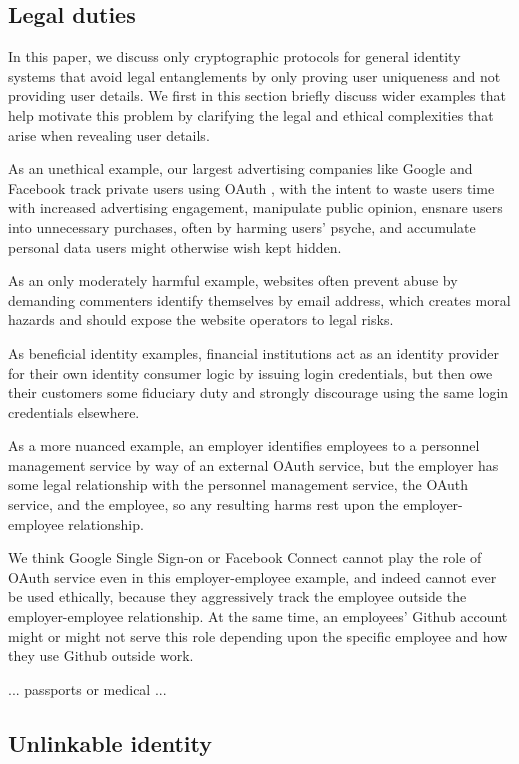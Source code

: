 \subsection{Legal duties}

In this paper, we discuss only cryptographic protocols for general identity systems that avoid legal entanglements by only proving user uniqueness and not providing user details.  We first in this section briefly discuss wider examples that help motivate this problem by clarifying the legal and ethical complexities that arise when revealing user details.

As an unethical example, our largest advertising companies like Google and Facebook track private users using OAuth \cite{oauth}, with the intent to waste users time with increased advertising engagement, manipulate public opinion, ensnare users into unnecessary purchases, often by harming users' psyche, and accumulate personal data users might otherwise wish kept hidden.

As an only moderately harmful example, websites often prevent abuse by demanding commenters identify themselves by email address, which creates moral hazards and should expose the website operators to legal risks.

As beneficial identity examples, financial institutions act as an identity provider for their own identity consumer logic by issuing login credentials, but then owe their customers some fiduciary duty and strongly discourage using the same login credentials elsewhere.  

As a more nuanced example, an employer identifies employees to a personnel management service by way of an external OAuth service, but the employer has some legal relationship with the personnel management service, the OAuth service, and the employee, so any resulting harms rest upon the employer-employee relationship.  

We think Google Single Sign-on or Facebook Connect cannot play the role of OAuth service even in this employer-employee example, and indeed cannot ever be used ethically, because they aggressively track the employee outside the employer-employee relationship.  At the same time, an employees' Github account might or might not serve this role depending upon the specific employee and how they use Github outside work.  

... passports or medical ...

\subsection{Unlinkable identity}

